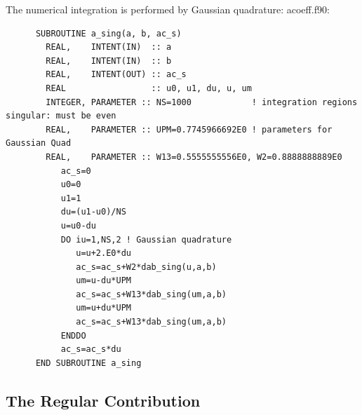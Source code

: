 \documentclass[preprint,12pt,eqsecnum,nofootinbib,amsmath,amssymb]{revtex4}
\begin{document}
\noindent
The numerical integration is performed by Gaussian quadrature:
\vskip0.4cm 
\noindent
acoeff.f90:
{
\baselineskip 10pt
\begin{verbatim}
      SUBROUTINE a_sing(a, b, ac_s)
        REAL,    INTENT(IN)  :: a
        REAL,    INTENT(IN)  :: b
        REAL,    INTENT(OUT) :: ac_s
        REAL                 :: u0, u1, du, u, um
        INTEGER, PARAMETER :: NS=1000            ! integration regions singular: must be even
        REAL,    PARAMETER :: UPM=0.7745966692E0 ! parameters for Gaussian Quad
        REAL,    PARAMETER :: W13=0.5555555556E0, W2=0.8888888889E0
           ac_s=0
           u0=0
           u1=1
           du=(u1-u0)/NS
           u=u0-du
           DO iu=1,NS,2 ! Gaussian quadrature
              u=u+2.E0*du
              ac_s=ac_s+W2*dab_sing(u,a,b)
              um=u-du*UPM
              ac_s=ac_s+W13*dab_sing(um,a,b)
              um=u+du*UPM
              ac_s=ac_s+W13*dab_sing(um,a,b)
           ENDDO
           ac_s=ac_s*du
      END SUBROUTINE a_sing
\end{verbatim}
}


\pagebreak
\subsection{The Regular Contribution}
\end{document}
